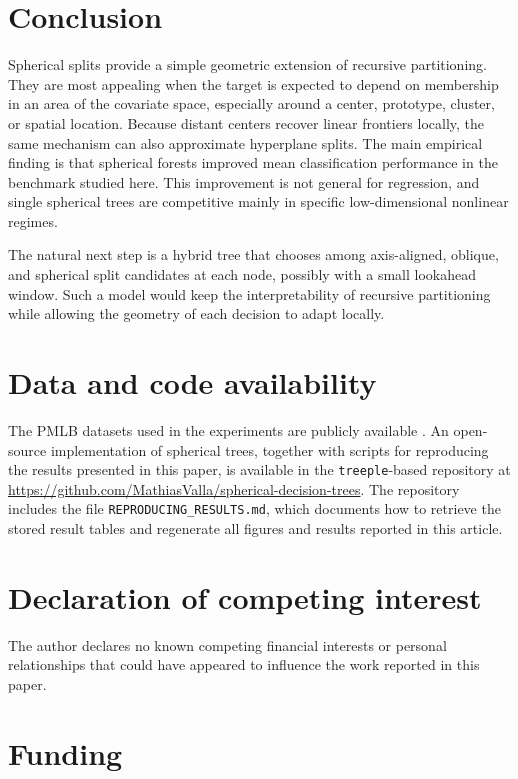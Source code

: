 \documentclass[final,5p,times,twocolumn]{elsarticle}
\begin{document}
\section{Conclusion}

Spherical splits provide a simple geometric extension of recursive partitioning.
They are most appealing when the target is expected to depend on membership in
an area of the covariate space, especially around a center, prototype, cluster,
or spatial location. Because distant centers recover linear frontiers locally,
the same mechanism can also approximate hyperplane splits. The main empirical
finding is that spherical forests improved mean classification performance in
the benchmark studied here. This improvement is not general for regression, and
single spherical trees are competitive mainly in specific low-dimensional
nonlinear regimes.

The natural next step is a hybrid tree that chooses among axis-aligned, oblique,
and spherical split candidates at each node, possibly with a small lookahead
window. Such a model would keep the interpretability of recursive partitioning
while allowing the geometry of each decision to adapt locally.

\section*{Data and code availability}

The PMLB datasets used in the experiments are publicly available
\cite{olson2017pmlb}. An open-source implementation of spherical trees,
together with scripts for reproducing the results presented in this paper, is
available in the \texttt{treeple}-based repository at
\url{https://github.com/MathiasValla/spherical-decision-trees}. The repository
includes the file \texttt{REPRODUCING\_RESULTS.md}, which documents how to
retrieve the stored result tables and regenerate all figures and results
reported in this article.

\section*{Declaration of competing interest}

The author declares no known competing financial interests or personal
relationships that could have appeared to influence the work reported in this
paper.

\section*{Funding}
\end{document}
